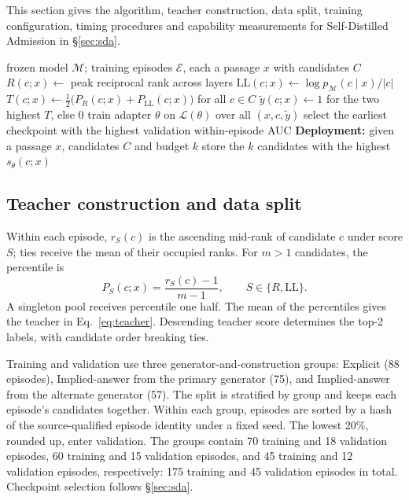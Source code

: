 This section gives the algorithm, teacher construction, data split, training configuration, timing procedures and capability measurements for Self-Distilled Admission in \S\ref{sec:sda}.

\begin{algorithm}[!htbp]
\caption{Self-Distilled Admission.}
\label{alg:sda}
\small
\begin{algorithmic}[1]
\Require frozen model $\mathcal M$; training episodes $\mathcal E$, each a passage $x$ with candidates $C$
    \State $R(c;x)\gets$ peak reciprocal rank across layers 
    \State $\mathrm{LL}(c;x)\gets\log p_{\mathcal M}(c\mid x)/|c|$
  \EndFor
  \State $T(c;x)\gets\tfrac12\bigl(P_R(c;x)+P_{\mathrm{LL}}(c;x)\bigr)$ for all $c\in C$ 
  \State $\tilde y(c;x)\gets 1$ for the two highest $T$, else $0$
\EndFor
\State train adapter $\theta$ on $\mathcal L(\theta)$ over all $(x,c,\tilde y)$ 
\State select the earliest checkpoint with the highest validation within-episode AUC
\Statex \textbf{Deployment:} given a passage $x$, candidates $C$ and budget $k$
\State store the $k$ candidates with the highest $s_\theta(c;x)$ 
\end{algorithmic}
\end{algorithm}


\subsection{Teacher construction and data split}

Within each episode, $r_S(c)$ is the ascending mid-rank of candidate $c$ under score $S$; ties receive the mean of their occupied ranks. For $m>1$ candidates, the percentile is
\begin{equation}
P_S(c;x)=\frac{r_S(c)-1}{m-1},
\qquad S\in\{R,\mathrm{LL}\}.
\label{eq:percentile}
\end{equation}
A singleton pool receives percentile one half. The mean of the percentiles gives the teacher in Eq.~\eqref{eq:teacher}. Descending teacher score determines the top-2 labels, with candidate order breaking ties.

Training and validation use three generator-and-construction groups: Explicit (88 episodes), Implied-answer from the primary generator (75), and Implied-answer from the alternate generator (57). The split is stratified by group and keeps each episode's candidates together. Within each group, episodes are sorted by a hash of the source-qualified episode identity under a fixed seed. The lowest 20\%, rounded up, enter validation. The groups contain 70 training and 18 validation episodes, 60 training and 15 validation episodes, and 45 training and 12 validation episodes, respectively: 175 training and 45 validation episodes in total. Checkpoint selection follows \S\ref{sec:sda}.


